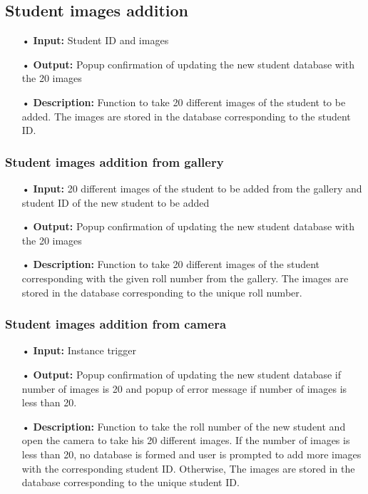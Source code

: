 \documentclass{scrreprt}
\begin{document}
\subsection{Student images addition}
\begin{enumerate}
\item[•]  \textbf{Input:}
Student ID and images
\item[•]  \textbf{Output:}
Popup confirmation of updating the new student database with the 20 images
\item[•]  \textbf{Description:}
Function to take 20 different images of the student to be added. The images are
stored in the database corresponding to the student ID.
\end{enumerate}

\subsubsection{Student images addition from gallery}
\begin{enumerate}
\item[•]  \textbf{Input:}
20 different images of the student to be added from the gallery and student ID of the new student to be added
\item[•]  \textbf{Output:}
Popup confirmation of updating the new student database with the 20 images
\item[•]  \textbf{Description:}
Function to take 20 different images of the student corresponding with the
given roll number from the gallery. The images are stored in the database
corresponding to the unique roll number.
\end{enumerate}

\subsubsection{Student images addition from camera}
\begin{enumerate}
\item[•]  \textbf{Input:}
Instance trigger
\item[•]  \textbf{Output:}
Popup confirmation of updating the new student database if number of images
is 20 and popup of error message if number of images is less than 20.
\item[•]  \textbf{Description:}
Function to take the roll number of the new student and open the camera to
take his 20 different images. If the number of images is less than 20, no database
is formed and user is prompted to add more images with the corresponding student ID.
Otherwise, The images are stored in the database corresponding to the unique student ID.
\end{enumerate}
\end{document}
